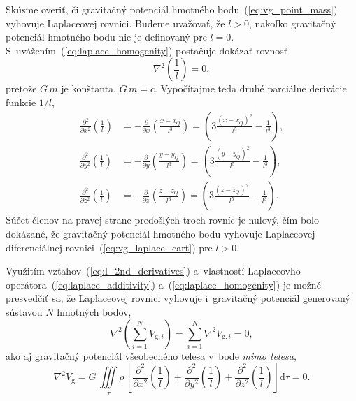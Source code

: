 \documentclass[a4paper,12pt]{book}
\newcommand{\diff}{\mathrm d}
\newcommand{\gidx}{\mathrm g}
\begin{document}
Skúsme overiť, či gravitačný potenciál hmotného bodu~(\ref{eq:vg_point_mass})
vyhovuje Laplaceovej rovnici.  Budeme uvažovať, že $l > 0$, nakoľko gravitačný
potenciál hmotného bodu nie je definovaný pre $l = 0$.
S~uvážením~(\ref{eq:laplace_homogenity}) postačuje dokázať rovnosť
%
\begin{equation}
\label{eq:nabla_l}
\nabla^2 \left( \frac{1}{l} \right) = 0{,}
\end{equation}
%
pretože $G \, m$ je konštanta, $G \, m = c$.  Vypočítajme teda druhé parciálne
derivácie funkcie $1 \slash l$,
%
\begin{equation}
\label{eq:l_2nd_derivatives}
\begin{split}
\frac{\partial^2}{\partial x^2} \left( \frac{1}{l} \right) &=
-\frac{\partial}{\partial x} \left( \frac{x - x_Q}{l^3} \right) = \left(3
\frac{(x - x_Q)^2}{l^5} - \frac{1}{l^3} \right){,}\\
%
\frac{\partial^2}{\partial y^2} \left( \frac{1}{l} \right) &=
-\frac{\partial}{\partial y} \left( \frac{y - y_Q}{l^3} \right) = \left(3
\frac{(y - y_Q)^2}{l^5} - \frac{1}{l^3} \right){,}\\
%
\frac{\partial^2}{\partial z^2} \left( \frac{1}{l} \right) &=
-\frac{\partial}{\partial z} \left( \frac{z - z_Q}{l^3} \right) = \left(3
\frac{(z - z_Q)^2}{l^5} - \frac{1}{l^3} \right){.}
\end{split}
\end{equation}
%
Súčet členov na pravej strane predošlých troch rovníc je nulový, čím bolo
dokázané, že gravitačný potenciál hmotného bodu vyhovuje Laplaceovej
diferenciálnej rovnici~(\ref{eq:vg_laplace_cart}) pre $l > 0$.

Využitím vzťahov~(\ref{eq:l_2nd_derivatives}) a~vlastností Laplaceovho
operátora~(\ref{eq:laplace_additivity}) a~(\ref{eq:laplace_homogenity}) je
možné presvedčiť sa, že Laplaceovej rovnici vyhovuje i~gravitačný potenciál
generovaný sústavou $N$ hmotných bodov,
%
\begin{equation}
\nabla^2 \left( \sum_{i = 1}^N V_{\gidx,i} \right) = \sum_{i = 1}^N \nabla^2
V_{\gidx,i} = 0{,}
\end{equation}
%
ako aj gravitačný potenciál všeobecného telesa v~bode \emph{mimo telesa},
%
\begin{equation}
\nabla^2 V_\gidx = G\, \iiint\limits_\tau \rho \, \left[ 
\frac{\partial^2}{\partial
x^2}\left(\frac{1}{l}\right) + \frac{\partial^2}{\partial
y^2}\left(\frac{1}{l}\right) + \frac{\partial^2}{\partial
z^2}\left(\frac{1}{l}\right) \right] \diff\tau = 0{.}
\end{equation}
\end{document}
